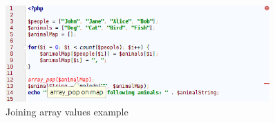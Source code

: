 \begin{figure}
\centering
\includegraphics[width=0.9\textwidth]{chapters/caseStudy/screens/pop}
\caption{Joining array values example}
\label{fig:arrayPopScreenshot}
\end{figure}





